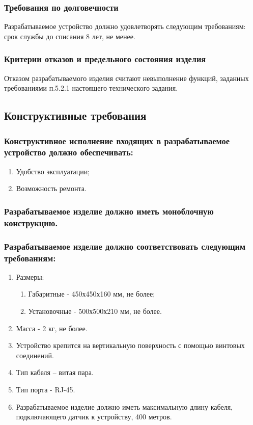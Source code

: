 			\subsubsection{Требования по долговечности}
				Разрабатываемое устройство должно удовлетворять следующим требованиям: срок службы до списания 8 лет, не менее.
			\subsubsection{Критерии отказов и предельного состояния изделия}
				Отказом разрабатываемого изделия считают невыполнение функций, заданных требованиями п.5.2.1 настоящего технического задания.
		\subsection{Конструктивные требования}
			\subsubsection{Конструктивное исполнение входящих в разрабатываемое устройство должно обеспечивать:}
				\begin{enumerate}
\changefontsizes[14pt]{14pt}
					\item Удобство эксплуатации;
					\item Возможность ремонта.
				\end{enumerate}
				\subsubsection{Разрабатываемое изделие должно иметь моноблочную конструкцию.}
				\subsubsection{Разрабатываемое изделие должно соответствовать следующим требованиям:}
					\begin{enumerate}
\changefontsizes[14pt]{14pt}
						\item Размеры:
							\begin{enumerate}
\changefontsizes[14pt]{14pt}
								\item Габаритные - 450х450х160 мм, не более;
								\item Установочные - 500х500х210 мм, не более.
							\end{enumerate}
						\item Масса - 2 кг, не более.
						\item Устройство крепится на вертикальную поверхность с помощью винтовых соединений.
						\item Тип кабеля – витая пара.
						\item Тип порта - RJ-45.
						\item Разрабатываемое изделие должно иметь максимальную длину кабеля, подключающего датчик к устройству, 400 метров.
					\end{enumerate}

